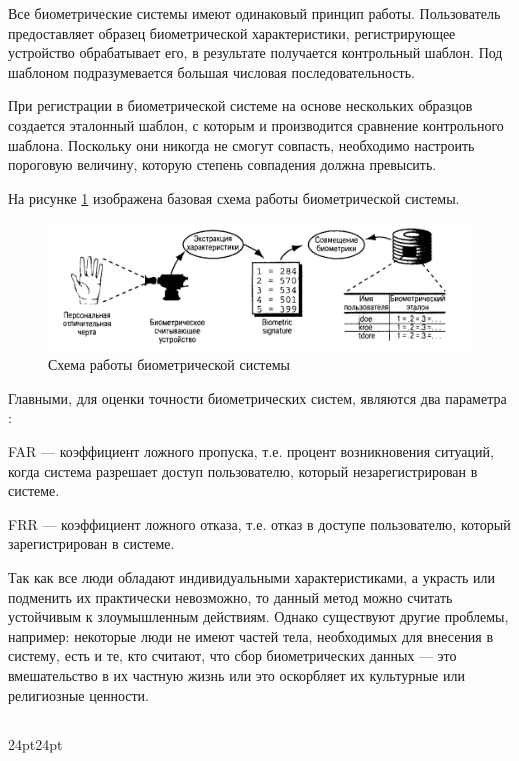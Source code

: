 Все биометрические системы имеют одинаковый принцип работы. Пользователь предоставляет образец биометрической характеристики, регистрирующее устройство обрабатывает его, в результате получается контрольный шаблон. Под шаблоном подразумевается большая числовая последовательность. 

При регистрации в биометрической системе на основе нескольких образцов создается эталонный шаблон, с которым и производится сравнение контрольного шаблона. Поскольку они никогда не смогут совпасть, необходимо настроить пороговую величину, которую степень совпадения должна превысить.

На рисунке \ref{fig:biometric} изображена базовая схема работы биометрической системы.

\begin{figure}[h]
    \centering
    \includegraphics[width=\textwidth]{img/biometric.png}
    \caption{Схема работы биометрической системы \cite{bib2}}
    \label{fig:biometric}
\end{figure}

Главными, для оценки точности биометрических систем, являются два параметра \cite{bib7}:

FAR --- коэффициент ложного пропуска, т.е. процент возникновения ситуаций, когда система разрешает доступ пользователю, который незарегистрирован в системе.

FRR --- коэффициент ложного отказа, т.е. отказ в доступе пользователю, который зарегистрирован в системе.

Так как все люди обладают индивидуальными характеристиками, а украсть или подменить их практически невозможно, то данный метод можно считать устойчивым к злоумышленным действиям. Однако существуют другие проблемы, например: некоторые люди не имеют частей тела, необходимых для внесения в систему, есть и те, кто считают, что сбор биометрических данных --- это вмешательство в их частную жизнь или это оскорбляет их культурные или религиозные ценности.

\titlespacing\subsection{\parindent}{24pt}{24pt}
